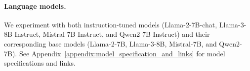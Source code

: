     
    
    
    \paragraph{Language models.} We experiment with both instruction-tuned models (Llama-2-7B-chat, Llama-3-8B-Instruct, Mistral-7B-Instruct, and Qwen2-7B-Instruct) and their corresponding base models (Llama-2-7B, Llama-3-8B, Mistral-7B, and Qwen2-7B). See Appendix~\ref{appendix:model_specification_and_links} for model specifications and links.
    
    
    
    
    